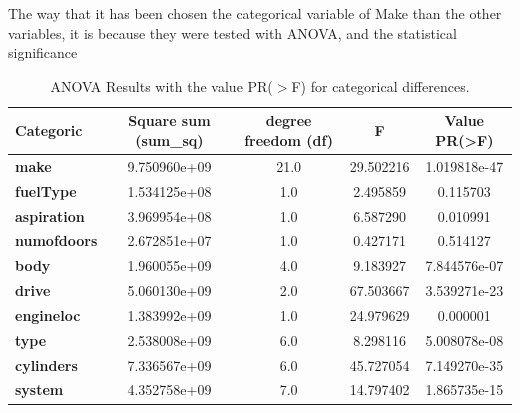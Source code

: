 \documentclass{article}
\begin{document}
The way that it has been chosen the categorical variable of Make than the other variables, it is because they were tested with ANOVA, and the statistical significance
\begin{table}[h]
  \centering
  \scriptsize
  \setlength{\extrarowheight}{2pt} 
  \begin{tabular}{|l|c|c|c|c|}
  \hline
  \textbf{Categoric} & \textbf{Square sum (sum\_sq)} & \textbf{degree freedom (df)} & \textbf{F} & \textbf{Value PR(>F)} \\ 
  \hline
  \textbf{make}       & 9.750960e+09 & 21.0 & 29.502216 & 1.019818e-47 \\
  \textbf{fuelType}   & 1.534125e+08 & 1.0  & 2.495859  & 0.115703 \\
  \textbf{aspiration} & 3.969954e+08 & 1.0  & 6.587290  & 0.010991 \\
  \textbf{numofdoors} & 2.672851e+07 & 1.0  & 0.427171  & 0.514127 \\
  \textbf{body}       & 1.960055e+09 & 4.0  & 9.183927  & 7.844576e-07 \\
  \textbf{drive}      & 5.060130e+09 & 2.0  & 67.503667 & 3.539271e-23 \\
  \textbf{engineloc}  & 1.383992e+09 & 1.0  & 24.979629 & 0.000001 \\
  \textbf{type}       & 2.538008e+09 & 6.0  & 8.298116  & 5.008078e-08 \\
  \textbf{cylinders}  & 7.336567e+09 & 6.0  & 45.727054 & 7.149270e-35 \\
  \textbf{system}     & 4.352758e+09 & 7.0  & 14.797402 & 1.865735e-15 \\
  \hline
  \end{tabular}
  \caption{ ANOVA Results with the value PR($>$F) for categorical differences.}
  \label{tab:anova_results}
  \end{table}
\end{document}
